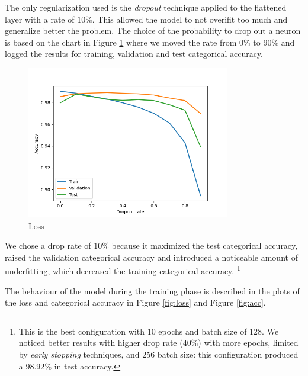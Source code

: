 \documentclass[compsoc]{IEEEtran}
\begin{document}
The only regularization used is the \emph{dropout} technique applied to the flattened layer with a rate of $10\%$. This allowed the model to not overifit too much and generalize better the problem. The choice of the probability to drop out a neuron is based on the chart in Figure \ref{fig:drop} where we moved the rate
from $0\%$ to $90\%$ and logged the results for training, validation and test categorical accuracy.


\begin{figure}[ht!]
\centering                                                                        
\includegraphics[width=3.5in]{drop.png}
\captionsetup{justification=centering}                                                                                         
\caption{Loss}
\label{fig:drop}                                                                                                                               
\end{figure}

We chose a drop rate of $10\%$ because it maximized the test categorical accuracy, raised the validation categorical accuracy and introduced a noticeable amount of underfitting, which decreased the training categorical accuracy. \footnote{This is the best configuration with 10 epochs and batch size of 128. We noticed better results with higher drop rate ($40\%$) with more epochs, limited by \emph{early stopping} techniques, and 256 batch size: this configuration produced a $98.92\%$ in test accuracy.}
\par

The behaviour of the model during the training phase is described in the plots of the loss and categorical accuracy in 
Figure \ref{fig:loss} and Figure \ref{fig:acc}. 
\end{document}

